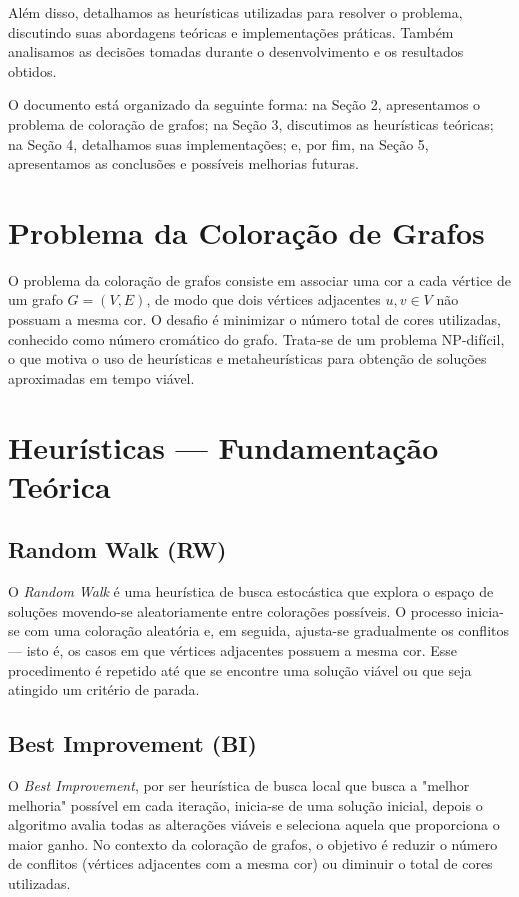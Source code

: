 \documentclass[12pt,a4paper]{article}
\begin{document}
Além disso, detalhamos as heurísticas utilizadas para resolver o problema, discutindo suas abordagens teóricas e implementações práticas. Também analisamos as decisões tomadas durante o desenvolvimento e os resultados obtidos.

O documento está organizado da seguinte forma: na Seção 2, apresentamos o problema de coloração de grafos; na Seção 3, discutimos as heurísticas teóricas; na Seção 4, detalhamos suas implementações; e, por fim, na Seção 5, apresentamos as conclusões e possíveis melhorias futuras.

\section{Problema da Coloração de Grafos}
\label{sec:problema}
O problema da coloração de grafos consiste em associar uma cor a cada vértice de um grafo \( G = (V, E) \), de modo que dois vértices adjacentes \( u, v \in V \) não possuam a mesma cor. O desafio é minimizar o número total de cores utilizadas, conhecido como número cromático do grafo. Trata-se de um problema NP-difícil, o que motiva o uso de heurísticas e metaheurísticas para obtenção de soluções aproximadas em tempo viável.

\section{Heurísticas — Fundamentação Teórica}
\label{sec:heuristicas}

\subsection{Random Walk (RW)}
O \textit{Random Walk} é uma heurística de busca estocástica que explora o espaço de soluções movendo-se aleatoriamente entre colorações possíveis. O processo inicia-se com uma coloração aleatória e, em seguida, ajusta-se gradualmente os conflitos — isto é, os casos em que vértices adjacentes possuem a mesma cor. Esse procedimento é repetido até que se encontre uma solução viável ou que seja atingido um critério de parada.

\subsection{Best Improvement (BI)}
O \textit{Best Improvement}, por ser heurística de busca local que busca a "melhor melhoria" possível em cada iteração, inicia-se de uma solução inicial, depois o algoritmo avalia todas as alterações viáveis e seleciona aquela que proporciona o maior ganho.
No contexto da coloração de grafos, o objetivo é reduzir o número de conflitos (vértices adjacentes com a mesma cor) ou diminuir o total de cores utilizadas. 
\end{document}
